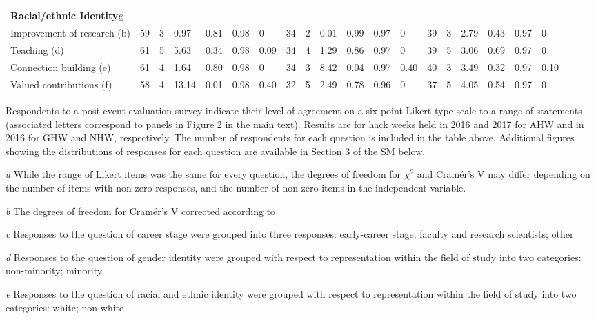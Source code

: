 \documentclass{aastex62}
\begin{document}
\begin{table}
\begin{threeparttable}
\begin{tabularx}{18cm}{p{3.6cm}p{0.42cm}p{0.42cm}p{0.42cm}p{0.42cm}p{0.42cm}p{0.42cm}p{0.42cm}p{0.42cm}p{0.42cm}p{0.42cm}p{0.42cm}p{0.42cm}p{0.42cm}p{0.42cm}p{0.42cm}p{0.42cm}p{0.42cm}p{0.42cm}}
\multicolumn{16}{l}{\textbf{Racial/ethnic Identity$\emph{e}$}} \\ \midrule
Improvement of research (b)  & 59 & 3 & 0.97 & 0.81 & 0.98 & 0 & 34 &2 & 0.01 & 0.99 & 0.97 & 0 & 39 & 3 & 2.79 & 0.43 & 0.97 & 0 \\
Teaching (d) & 61 & 5 & 5.63 & 0.34 & 0.98 & 0.09 & 34 & 4 & 1.29 & 0.86 & 0.97 & 0 & 39 & 5 & 3.06 & 0.69 & 0.97 & 0 \\
Connection building (e) & 61 & 4 & 1.64 & 0.80 & 0.98 & 0 & 34 & 3 & 8.42 & 0.04 & 0.97 & 0.40 & 40 & 3 & 3.49 & 0.32 & 0.97 & 0.10 \\
Valued contributions (f) & 58 & 4 & 13.14 & 0.01 & 0.98 & 0.40 & 32 & 5 & 2.49 & 0.78 & 0.96 & 0 & 37 & 5 & 4.05 & 0.54 & 0.97 & 0 \\
\bottomrule
\end{tabularx}
   \begin{tablenotes}
      \item{Respondents to a post-event evaluation survey indicate their level of agreement on a six-point Likert-type scale to a range of statements (associated letters correspond to panels in Figure 2 in the main text). Results are for hack weeks held in 2016 and 2017 for AHW and in 2016 for GHW and NHW, respectively. The number of respondents for each question is included in the table above. Additional figures showing the distributions of responses for each question are available in Section 3 of the SM below.}
      \item[\emph{a}]{While the range of Likert items was the same for every question, the degrees of freedom for $\chi^2$ and Cram\'{e}r's V may differ depending on the number of items with non-zero responses, and the number of non-zero items in the independent variable.}
      \item[\emph{b}]{The degrees of freedom for Cram\'{e}r's V corrected according to~\citep{bergsma2013}}
      \item[\emph{c}]{Responses to the question of career stage were grouped into three responses: early-career stage; faculty and research scientists; other}
      \item[\emph{d}]{Responses to the question of gender identity were grouped with respect to representation within the field of study into two categories: non-minority; minority}
      \item[\emph{e}]{Responses to the question of racial and ethnic identity were grouped with respect to representation within the field of study into two categories: white; non-white}
\end{tablenotes}

\end{threeparttable}
\label{tab:survey}
\end{table}
\end{document}
